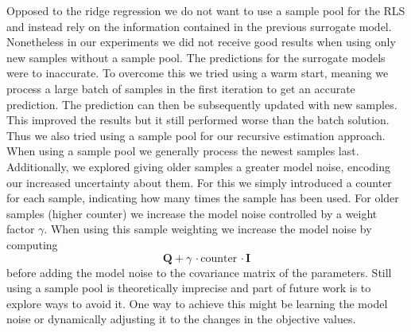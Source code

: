 Opposed to the ridge regression we do not want to use a sample pool
for the RLS and instead rely on the information contained in
the previous surrogate model.
Nonetheless in our experiments we did not receive good results when
using only new samples without a sample pool.
The predictions for the surrogate models were to inaccurate.
To overcome this we tried using a warm start, meaning we
process a large batch of samples in the first iteration to get 
an accurate prediction. The prediction can then be subsequently
updated with new samples. This improved the results but
it still performed worse than the batch solution.
Thus we also tried using a sample pool for our recursive estimation approach.
When using a sample pool we generally process the newest samples
last. Additionally, we explored giving older samples 
a greater model noise, encoding our increased uncertainty about them.
For this we simply introduced a counter for each sample,
indicating how many times the sample has been used.
For older samples (higher counter) we increase the model noise controlled
by a weight factor $\gamma$.
When using this sample weighting we increase the model noise by computing
$$ \mathbf{Q} + \gamma \,\cdot \text{counter} \, \cdot \mathbf{I} $$
before adding the model noise to the covariance
matrix of the parameters.
Still using a sample pool is theoretically imprecise and part
of future work is to explore ways to avoid it.
One way to achieve this might be learning the model noise
or dynamically adjusting it to the changes in the objective values.
